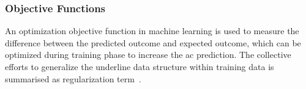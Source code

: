 \subsubsection{Objective Functions}
An optimization objective function in machine learning is used to measure the difference between the predicted outcome and expected outcome, which can be optimized during training phase to increase the ac prediction. The collective efforts to generalize the underline data structure within training data is summarised as regularization term~\cite{goodfellow_2015}.  